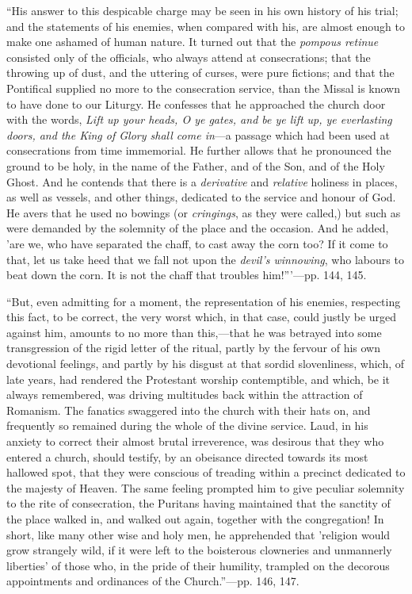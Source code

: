 ``His answer to this despicable
charge may be seen in his own history of his trial; and the statements
of his enemies, when compared with his, are almost enough to make one
ashamed of human nature. It turned out that the \emph{pompous retinue}
consisted only of the officials, who always attend at consecrations;
that the throwing up of dust, and the uttering
of curses, were pure fictions; and that the Pontifical supplied no more
to the consecration service, than the Missal is known to have done to
our Liturgy. He confesses that he approached the church door with the
words, \emph{Lift up your heads, O ye gates, and be ye lift up, ye
everlasting doors, and the King of Glory shall come in}—a passage
which had been used at consecrations from time immemorial. He further
allows that he pronounced the ground to be holy, in the name of the
Father, and of the Son, and of the Holy Ghost. And he contends that
there is a \emph{derivative} and \emph{relative} holiness in places, as
well as vessels, and other things, dedicated to the service and honour
of God. He avers that he used no bowings (or \emph{cringings}, as they
were called,) but such as were demanded by the solemnity of the place
and the occasion. And he added, 'are we, who have separated the chaff,
to cast away the corn too? If it come to that, let us take heed that we
fall not upon the \emph{devil's winnowing}, who labours to beat down the
corn. It is not the chaff that troubles him!'''—pp. 144, 145.

``But, even admitting for a moment,
the representation of his enemies, respecting this fact, to be correct,
the very worst which, in that case, could justly be urged against him,
amounts to no more than this,—that he was betrayed into some
transgression of the rigid letter of the ritual, partly by the fervour
of his own devotional feelings, and partly by his disgust at that sordid
slovenliness, which, of late years, had rendered the Protestant worship
contemptible, and which, be it always remembered, was driving multitudes
back within the attraction of Romanism. The fanatics swaggered into the
church with their hats on, and frequently so remained during the whole
of the divine service. Laud, in his anxiety to correct their almost
brutal irreverence, was desirous that they who entered a church, should
testify, by an obeisance directed towards its most hallowed spot, that
they were conscious of treading within a precinct dedicated to the
majesty of Heaven. The same feeling prompted him to give peculiar
solemnity to the rite of consecration, the Puritans having maintained
that the sanctity of the place walked in, and walked out again, together
with the congregation! In short, like many other wise and holy men, he
apprehended that 'religion would grow strangely wild, if it were left to
the boisterous clowneries and unmannerly liberties' of those who, in the
pride of their humility, trampled on the decorous appointments and
ordinances of the Church.''—pp. 146, 147.

